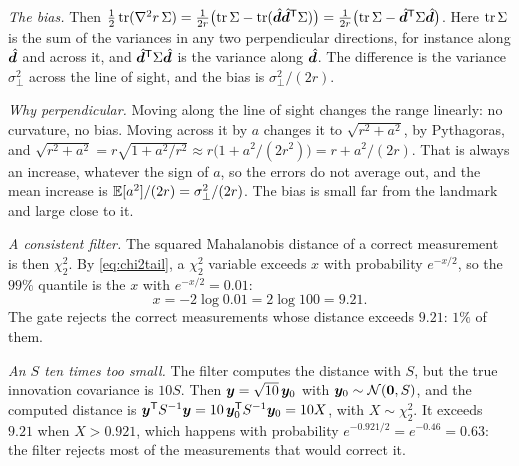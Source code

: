 \emph{The bias.} Then
$\tfrac12\operatorname{tr}(\nabla^2r\,\Sigma)=\tfrac1{2r}\bigl(\operatorname{tr}\Sigma-\operatorname{tr}(\hat{\bm{d}}\hat{\bm{d}}^{\mathsf{T}}\Sigma)\bigr)=\tfrac1{2r}\bigl(\operatorname{tr}\Sigma-\hat{\bm{d}}^{\mathsf{T}}\Sigma\hat{\bm{d}}\bigr)$. Here $\operatorname{tr}\Sigma$ is the sum of the
variances in any two perpendicular directions, for instance along
$\hat{\bm{d}}$ and across it, and $\hat{\bm{d}}^{\mathsf{T}}\Sigma\hat{\bm{d}}$
is the variance along $\hat{\bm{d}}$. The difference is the variance
$\sigma_\perp^2$ across the line of sight, and the bias is
$\sigma_\perp^2/(2r)$.

\emph{Why perpendicular.} Moving along the line of sight changes the range
linearly: no curvature, no bias. Moving across it by $a$ changes it to
$\sqrt{r^2+a^2}$, by Pythagoras, and
$\sqrt{r^2+a^2}=r\sqrt{1+a^2/r^2}\approx r\bigl(1+a^2/(2r^2)\bigr)
=r+a^2/(2r)$. That is always an increase, whatever the sign of $a$, so
the errors do not average out, and the mean increase is
$\mathbb{E}[a^2]/(2r)=\sigma_\perp^2/(2r)$. The bias is small far from the
landmark and large close to it.

 \emph{A consistent filter.} The squared Mahalanobis
distance of a correct measurement is then $\chi^2_2$. By
\eqref{eq:chi2tail}, a $\chi^2_2$ variable exceeds $x$ with probability
$e^{-x/2}$, so the $99\%$ quantile is the $x$ with $e^{-x/2}=0.01$:
\[
  x=-2\log0.01=2\log100=9.21 .
\]
The gate rejects the correct measurements whose distance exceeds $9.21$:
$1\%$ of them.

\emph{An $S$ ten times too small.} The filter computes the distance with
$S$, but the true innovation covariance is $10S$. Then $\bm{y}=\sqrt{10}\,
\bm{y}_0$ with $\bm{y}_0\sim\mathcal{N}(\bm{0},S)$, and the computed distance is
$\bm{y}^{\mathsf{T}} S^{-1}\bm{y}=10\,\bm{y}_0^{\mathsf{T}} S^{-1}\bm{y}_0=10X$, with $X\sim\chi^2_2$. It
exceeds $9.21$ when $X>0.921$, which happens with probability
$e^{-0.921/2}=e^{-0.46}=0.63$: the filter rejects most of the
measurements that would correct it.
